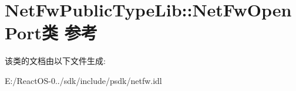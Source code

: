 \hypertarget{class_net_fw_public_type_lib_1_1_net_fw_open_port}{}\section{Net\+Fw\+Public\+Type\+Lib\+:\+:Net\+Fw\+Open\+Port类 参考}
\label{class_net_fw_public_type_lib_1_1_net_fw_open_port}


该类的文档由以下文件生成\+:\begin{DoxyCompactItemize}
\item 
E\+:/\+React\+O\+S-\/0../sdk/include/psdk/netfw.\+idl\end{DoxyCompactItemize}
